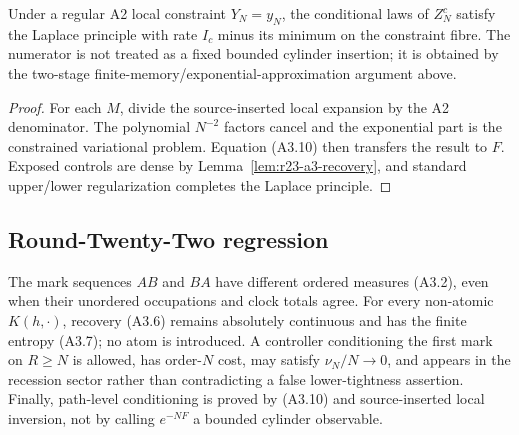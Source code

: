 \begin{corollary}
\label{cor:r23-a3-conditioned}
Under a regular A2 local constraint $Y_N=y_N$, the conditional laws of
$Z_N^c$ satisfy the Laplace principle with rate
$I_c$ minus its minimum on the constraint fibre.  The numerator is not treated
as a fixed bounded cylinder insertion; it is obtained by the two-stage
finite-memory/exponential-approximation argument above.
\end{corollary}

\begin{proof}
For each $M$, divide the source-inserted local expansion by the A2 denominator.
The polynomial $N^{-2}$ factors cancel and the exponential part is the
constrained variational problem.  Equation (A3.10) then transfers the result
to $F$.  Exposed controls are dense by Lemma~\ref{lem:r23-a3-recovery}, and
standard upper/lower regularization completes the Laplace principle.
\end{proof}

\subsection{Round-Twenty-Two regression}

The mark sequences $AB$ and $BA$ have different ordered measures (A3.2), even
when their unordered occupations and clock totals agree.  For every non-atomic
$K(h,\cdot)$, recovery (A3.6) remains absolutely continuous and has the finite
entropy (A3.7); no atom is introduced.  A controller conditioning the first
mark on $R\ge N$ is allowed, has order-$N$ cost, may satisfy
$\nu_N/N\to0$, and appears in the recession sector rather than contradicting a
false lower-tightness assertion.  Finally, path-level conditioning is proved
by (A3.10) and source-inserted local inversion, not by calling $e^{-NF}$ a
bounded cylinder observable.
